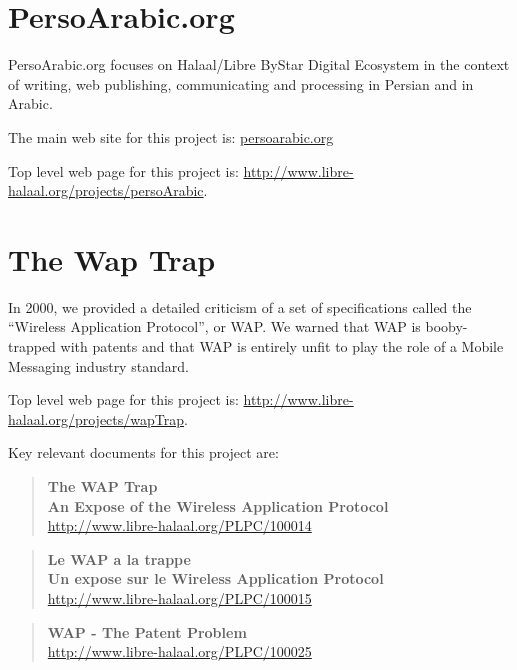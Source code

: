 \section{PersoArabic.org}

PersoArabic.org focuses on Halaal/Libre ByStar Digital Ecosystem in the context of
writing, web publishing, communicating and processing in Persian and in Arabic.

The main web site for this project is:
\href{http://www.persoarabic.org}{persoarabic.org}

Top level web page for this project is: \href{http://www.libre-halaal.org/projects/persoArabic}{http://www.libre-halaal.org/projects/persoArabic}.

\section{The Wap Trap}

In 2000, we provided a detailed criticism of a set of specifications called the ``Wireless
Application Protocol'', or WAP. We warned that WAP is booby-trapped with patents and that
WAP is entirely unfit to play the role of a Mobile Messaging industry standard. 

Top level web page for this project is: \href{http://www.libre-halaal.org/projects/wapTrap}{http://www.libre-halaal.org/projects/wapTrap}.

Key relevant documents for this project are:

\begin{quote}
  \textbf{The WAP Trap}\\
  \textbf{An Expose of the Wireless Application Protocol}\\
  \href{http://www.libre-halaal.org/PLPC/100014}{http://www.libre-halaal.org/PLPC/100014}
\end{quote}


\begin{quote}
  \textbf{Le WAP a la trappe}\\
  \textbf{Un expose sur le Wireless Application Protocol}\\
  \href{http://www.libre-halaal.org/PLPC/100015}{http://www.libre-halaal.org/PLPC/100015}
\end{quote}


\begin{quote}
  \textbf{WAP - The Patent Problem}\\
  \href{http://www.libre-halaal.org/PLPC/100025}{http://www.libre-halaal.org/PLPC/100025}
\end{quote}


